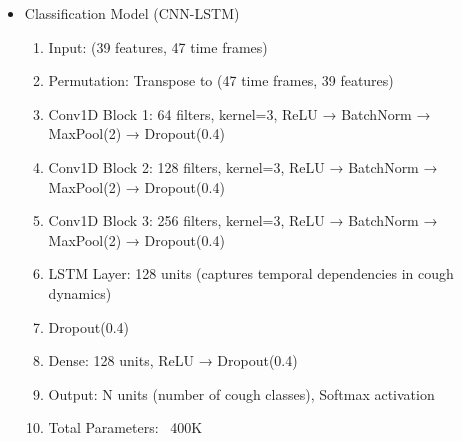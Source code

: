 \documentclass[conference]{IEEEtran}
\begin{document}
\begin{enumerate}
\begin{itemize}
\begin{enumerate}
                            \item Conv1D Block 2: 64 filters, kernel=3, ReLU → BatchNorm → MaxPool(2) → Dropout(0.3)
                            \item Conv1D Block 3: 128 filters, kernel=3, ReLU → BatchNorm → MaxPool(2) → Dropout(0.3)
                            \item Global Average Pooling: Reduces temporal dimension 
                            \item Dense: 64 units, ReLU → Dropout(0.3) 
                            \item Output: 1 unit, Sigmoid activation 
                            \item Total Parameters: ~50K (lightweight for edge deployment) 
                        \end{enumerate}
                    \item Classification Model (CNN-LSTM)
                        \begin{enumerate} 
                            \item Input: (39 features, 47 time frames) 
                            \item Permutation: Transpose to (47 time frames, 39 features) 
                            \item Conv1D Block 1: 64 filters, kernel=3, ReLU → BatchNorm → MaxPool(2) → Dropout(0.4)
                            \item Conv1D Block 2: 128 filters, kernel=3, ReLU → BatchNorm → MaxPool(2) → Dropout(0.4)
                            \item Conv1D Block 3: 256 filters, kernel=3, ReLU → BatchNorm → MaxPool(2) → Dropout(0.4)
                            \item LSTM Layer: 128 units (captures temporal dependencies in cough dynamics) 
                            \item Dropout(0.4) 
                            \item Dense: 128 units, ReLU → Dropout(0.4) 
                            \item Output: N units (number of cough classes), Softmax activation 
                            \item Total Parameters: ~400K 
                        \end{enumerate}
                \end{itemize}
        \end{enumerate}
\end{document}
